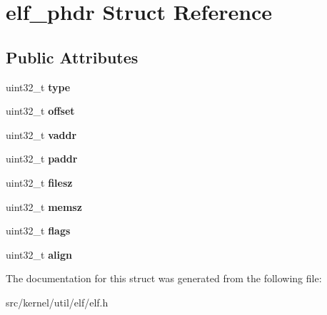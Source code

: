 \hypertarget{structelf__phdr}{}\section{elf\+\_\+phdr Struct Reference}
\label{structelf__phdr}
\subsection*{Public Attributes}
\begin{DoxyCompactItemize}
\item 
\mbox{\label{structelf__phdr_a4225ebc1b0bbea0495ee268dc6160a8b}} 
uint32\+\_\+t {\bfseries type}
\item 
\mbox{\label{structelf__phdr_a3cdf755ae6856ae6336963eb0a5f0eaa}} 
uint32\+\_\+t {\bfseries offset}
\item 
\mbox{\label{structelf__phdr_a8af51e0bc0a599cacdb5da5aba558ccd}} 
uint32\+\_\+t {\bfseries vaddr}
\item 
\mbox{\label{structelf__phdr_a7ac4dde66c79fe10447086b4d1e9d158}} 
uint32\+\_\+t {\bfseries paddr}
\item 
\mbox{\label{structelf__phdr_a426778971abae6487905dd3a87d23f5c}} 
uint32\+\_\+t {\bfseries filesz}
\item 
\mbox{\label{structelf__phdr_a73829ca51c194c33c82e1f9148de8fbd}} 
uint32\+\_\+t {\bfseries memsz}
\item 
\mbox{\label{structelf__phdr_a7abbf01a73156eaf36d87632d7950f67}} 
uint32\+\_\+t {\bfseries flags}
\item 
\mbox{\label{structelf__phdr_ac12c05a98735e196ecfd7c46a008556c}} 
uint32\+\_\+t {\bfseries align}
\end{DoxyCompactItemize}


The documentation for this struct was generated from the following file\+:\begin{DoxyCompactItemize}
\item 
src/kernel/util/elf/elf.\+h\end{DoxyCompactItemize}
